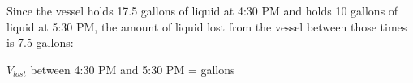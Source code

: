 Since the vessel holds 17.5 gallons of liquid at 4:30 PM and holds 10 gallons of liquid at 5:30 PM, the amount of liquid lost from the vessel between those times is 7.5 gallons:

\vskip 10pt

$V_{lost}$ between 4:30 PM and 5:30 PM =  gallons











